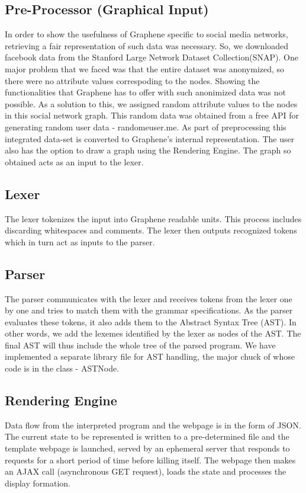 \documentclass[a4paper]{article}
\begin{document}
\subsection{Pre-Processor (Graphical Input)}

In order to show the usefulness of Graphene specific to social media networks, retrieving a fair representation of such data was necessary. So, we downloaded facebook data from the Stanford Large Network Dataset Collection(SNAP). One major problem that we faced was that the entire dataset was anonymized, so there were no attribute values correspoding to the nodes. Showing the functionalities that Graphene has to offer with such anonimized data was not possible. As a solution to this, we assigned random attribute values to the nodes in this social network graph. This random data was obtained from a free API for generating random user data - randomeuser.me. 
As part of preprocessing this integrated data-set is converted to Graphene's internal representation. The user also has the option to draw a graph using the Rendering Engine. The graph so obtained acts as an input to the lexer.

\subsection{Lexer}
The lexer tokenizes the input into Graphene readable units. This process includes discarding whitespaces and comments. The lexer then outputs recognized tokens which in turn act as inputs to the parser.

\subsection{Parser}
The parser communicates with the lexer and receives tokens from the lexer one by one and tries to match them with the grammar specifications. As the parser evaluates these tokens, it also adds them to the Abstract Syntax Tree (AST). In other words, we add the lexemes identified by the lexer as nodes of the AST. The final AST will thus include the whole tree of the parsed program. We have implemented a separate library file for AST handling, the major chuck of whose code is in the class - ASTNode.

\subsection{Rendering Engine}
\noindent Data flow from the interpreted program and the webpage is in the form of JSON. The current state to be represented is written to a pre-determined file and the template webpage is launched, served by an ephemeral server that responds to requests for a short period of time before killing itself. The webpage then makes an AJAX call (asynchronous GET request), loads the state and processes the display formation. \\
\end{document}
